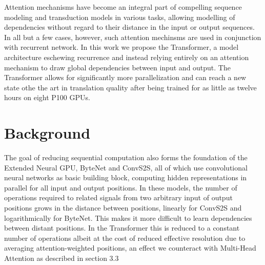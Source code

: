 \documentclass{article}
\begin{document}
Attention mechanisms have become an integral part of compelling sequence modeling and transduction models in various tasks, allowing modelling of dependencies without regard to their distance in the input or output sequences\cite{2,9}.
In all but a few cases\cite{27}, however, such attention mechinsms are used in conjunction with recurrent network.
In this work we propose the Transformer, a model architecture eschewing recurrence and instead relying entirely on  an attention mechanism to draw global dependencies between input and output.
The Transformer allows for significantly more parallelization and can reach a new state othe the art in translation quality after being trained for as little as twelve hours on eight P100 GPUs.

\section{Background}
The goal of reducing sequential computation also forms the foundation of the Extended Neural GPU\cite{16}, ByteNet\cite{18} and ConvS2S\cite{9}, all of which use convolutional neural networks as basic building block, computing hidden representations in parallel for all input and output positions.
In these models, the number of operations required to related signals from two arbitrary input of output positions grows in the distance between positions, linearly for ConvS2S and logarithmically for ByteNet.
This makes it more difficult to learn dependencies between distant positions\cite{12}. In the Transformer this is reduced to a constant number of operations albeit at the cost of reduced effective resolution due to averaging attention-weighted positions, an effect we counteract with Multi-Head Attention as described in section 3.3
\end{document}
